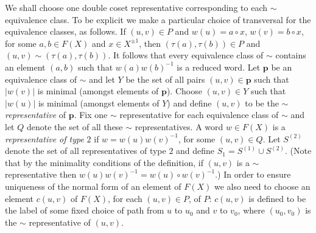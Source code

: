 \documentclass[a4paper,12pt]{article}
\renewcommand{\t}{\tau }
\newcommand{\pp}{\mathbf{p}}
\numberwithin{equation}{section}
\numberwithin{figure}{section}
\begin{document}
We shall choose one double coset representative corresponding to each $\sim$
equivalence class. To be explicit we make a particular choice of transversal
for the equivalence classes, as follows.
If $(u,v)\in P$ and $w(u)=a\circ x$, $w(v)=b\circ x$, for some $a,b\in F(X)$ and
$x\in X^{\pm 1}$, then $(\t(a),\t(b))\in P$ and $(u,v)\sim (\t(a),\t(b))$. It follows
that every equivalence class of $\sim$ contains an element $(a,b)$ such that
$w(a)w(b)^{-1}$ is a reduced word. Let $\pp$ be an equivalence class of $\sim$ and
let $Y$ be the set of all pairs $(u,v)\in \pp$ such that $|w(v)|$ is minimal (amongst
elements of $\pp$). Choose $(u,v)\in Y$ such that $|w(u)|$ is minimal (amongst elements
of $Y$) and define $(u,v)$ to be the $\sim${\em representative} of $\pp$. Fix
one $\sim$ representative for each equivalence class of $\sim$ and
let $Q$ denote the set of  all these $\sim$ representatives. A word $w\in F(X)$ is
 a {\em representative of type} $2$ if $w=w(u)w(v)^{-1}$, for some $(u,v)\in Q$.
Let $S^{(2)}$ denote the set of all representatives of type $2$
and define $S_1=S^{(1)}\cup S^{(2)}$. (Note that by the minimality
conditions of the definition, if $(u,v)$ is a $\sim$
representative then $w(u)w(v)^{-1}=w(u)\circ w(v)^{-1}$.) In order
to ensure uniqueness of the normal form of an element of $F(X)$ we
also need to choose an element $c(u,v)$ of $F(X)$, for each
$(u,v)\in P$, of $P$: $c(u,v)$ is defined to be the label of some
fixed choice of path from $u$ to $u_0$ and $v$ to $v_0$, where
$(u_0,v_0)$ is the $\sim$ representative of $(u,v)$.
\end{document}
